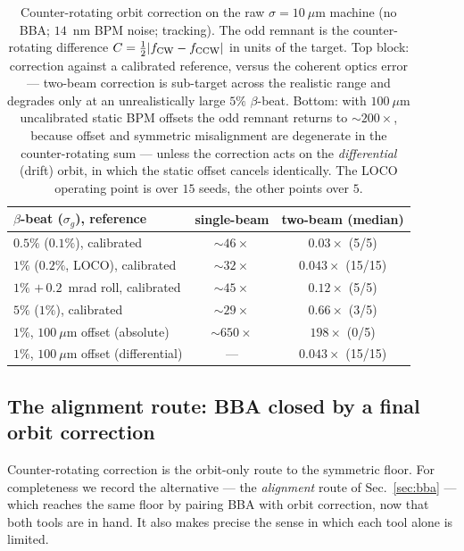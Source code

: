 \documentclass[aps,prab,reprint,superscriptaddress,nofootinbib]{revtex4-2}
\begin{document}
\begin{table}[tb]
\caption{Counter-rotating orbit correction on the raw $\sigma=10~\mu$m machine
(no BBA; $14$~nm BPM noise; tracking).  The odd remnant is the
counter-rotating difference $C=\tfrac12|f_{\rm CW}-f_{\rm CCW}|$ in units of the
target.  Top block: correction against a calibrated reference, versus the
coherent optics error --- two-beam correction is sub-target across the realistic
range and degrades only at an unrealistically large $5\%$ $\beta$-beat.  Bottom:
with $100~\mu$m uncalibrated static BPM offsets the odd remnant returns to
$\sim\!200\times$, because offset and symmetric misalignment are degenerate in
the counter-rotating sum --- unless the correction acts on the \emph{differential}
(drift) orbit, in which the static offset cancels identically.  The LOCO
operating point is over $15$ seeds, the other points over $5$.}
\label{tab:twobeam}
\small
\begin{ruledtabular}
\begin{tabular}{lcc}
$\beta$-beat ($\sigma_g$), reference & single-beam & two-beam (median) \\
\hline
$0.5\%$ ($0.1\%$), calibrated        & $\sim\!46\times$ & $0.03\times$ \;(5/5) \\
$1\%$ ($0.2\%$, LOCO), calibrated     & $\sim\!32\times$ & $0.043\times$ \;(15/15) \\
$1\%$ $+\,0.2$~mrad roll, calibrated   & $\sim\!45\times$ & $0.12\times$ \;(5/5) \\
$5\%$ ($1\%$), calibrated             & $\sim\!29\times$ & $0.66\times$ \;(3/5) \\
\hline
$1\%$, $100~\mu$m offset (absolute)   & $\sim\!650\times$ & $198\times$ \;(0/5) \\
$1\%$, $100~\mu$m offset (differential) & --- & $0.043\times$ \;(15/15) \\
\end{tabular}
\end{ruledtabular}
\end{table}


\subsection{The alignment route: BBA closed by a final orbit correction}
\label{sec:chainclose}

Counter-rotating correction is the orbit-only route to the symmetric floor.  For
completeness we record the alternative --- the \emph{alignment} route of
Sec.~\ref{sec:bba} --- which reaches the same floor by pairing BBA with orbit
correction, now that both tools are in hand.  It also makes precise the sense in
which each tool alone is limited.
\end{document}
